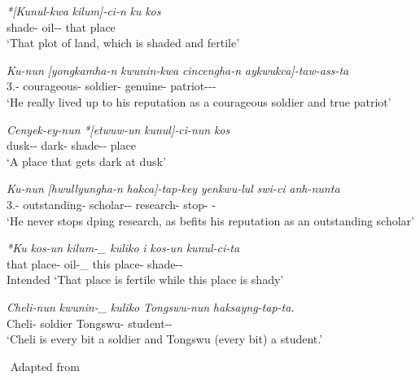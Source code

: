 \begin{exe}
    \ex \label{koreanlexical}
    \begin{xlist}
    \ex \label{koreanconjoined1}
    \gll
    \textit{*[Kunul-kwa} \textit{kilum]-ci-n} \textit{ku} \textit{kos} \\ shade-{\Conj} oil-{\Der}-{\Rel} that place \\
    \glt `That plot of land, which is shaded and fertile'
    
    \ex \label{koreanconjoined2}
    \gll 
    \textit{Ku-nun} \textit{[yongkamha-n} \textit{kwunin-kwa} \textit{cincengha-n} \textit{aykwukca]-taw-ass-ta}\\
    3.{\Sg}-{\Top} courageous-{\Rel} soldier-{\Conj} genuine-{\Rel} patriot-{\Der}-{\Pst}-{\Decl} \\
    \glt `He really lived up to his reputation as a courageous soldier and true patriot'
 
    
    \ex \label{koreanmodified1}
    \gll 
    \textit{Cenyek-ey-nun} \textit{*[etwuw-un} \textit{kunul]-ci-nun} \textit{kos} \\ dusk-{\Loc}-{\Top} dark-{\Rel} shade-{\Der}-{\Rel} place\\
    \glt `A place that gets dark at dusk'
    
    \ex \label{koreanmodified2}
    \gll 
    \textit{Ku-nun} \textit{[hwullyungha-n} \textit{hakca]-tap-key} \textit{yenkwu-lul} \textit{swi-ci} \textit{anh-nunta} \\ 3.{\Sg}-{\Top} outstanding-{\Rel} scholar-{\Der}-{\Comp} research-{\Acc} stop-{\Comp} {\Neg}-{\Prs} \\
    \glt `He never stops dping research, as befits his reputation as an outstanding scholar'
    
    
    \ex \label{koreangapping1}
    \gll 
    \textit{*Ku} \textit{kos-un}  \textit{kilum-\_} \textit{kuliko} \textit{i} \textit{kos-un} \textit{kunul-ci-ta} \\ that place-{\Top} oil-\_ {\And} this place-{\Top} shade-{\Der}-{\Decl} \\
    \glt Intended `That place is fertile while this place is shady'
    
    \ex \label{koreangapping2}
    \gll 
    \textit{Cheli-nun} \textit{kwunin-\_} \textit{kuliko} \textit{Tongswu-nun} \textit{haksayng-tap-ta.} \\ Cheli-{\Top} soldier {\And} Tongswu-{\Top} student-{\Der}-{\Decl} \\
    \glt `Cheli is every bit a soldier and Tongswu (every bit) a student.'
    \end{xlist}
    ${}$ \hfill Adapted from \cite{yoon2017lexical}
\end{exe}

